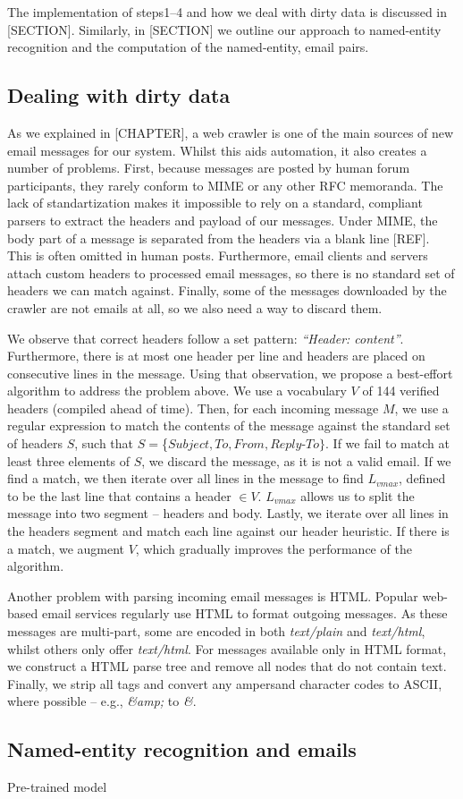 The implementation of steps1--4 and how we deal with dirty data is discussed in [SECTION]. Similarly, in [SECTION] we outline our approach to named-entity recognition and the computation of the named-entity, email pairs.

\subsection{Dealing with dirty data}
As we explained in [CHAPTER], a web crawler is one of the main sources of new email messages for our system. Whilst this aids automation, it also creates a number of problems. First, because messages are posted by human forum participants, they rarely conform to MIME or any other RFC memoranda. The lack of standartization makes it impossible to rely on a standard, compliant parsers to extract the headers and payload of our messages. Under MIME, the body part of a message is separated from the headers via a blank line [REF]. This is often omitted in human posts. Furthermore, email clients and servers attach custom headers to processed email messages, so there is no standard set of headers we can match against. Finally, some of the messages downloaded by the crawler are not emails at all, so we also need a way to discard them.

We observe that correct headers follow a set pattern: \textit{``Header: content''}. Furthermore, there is at most one header per line and headers are placed on consecutive lines in the message. Using that observation, we propose a best-effort algorithm to address the problem above. We use a vocabulary $V$ of 144 verified headers (compiled ahead of time). Then, for each incoming message $M$, we use a regular expression to match the contents of the message against the standard set of headers $S$, such that $S = $\{$Subject, To, From, Reply$-$To\}$. If we fail to match at least three elements of $S$, we discard the message, as it is not a valid email. If we find a match, we then iterate over all lines in the message to find $L_{vmax}$, defined to be the last line that contains a header $\in V$. $L_{vmax}$ allows us to split the message into two segment -- headers and body. Lastly, we iterate over all lines in the headers segment and match each line against our header heuristic. If there is a match, we augment $V$, which gradually improves the performance of the algorithm.

Another problem with parsing incoming email messages is HTML. Popular web-based email services regularly use HTML to format outgoing messages. As these messages are multi-part, some are encoded in both \emph{text/plain} and \emph{text/html}, whilst others only offer \emph{text/html}. For messages available only in HTML format, we construct a HTML parse tree and remove all nodes that do not contain text. Finally, we strip all tags and convert any ampersand character codes to ASCII, where possible -- e.g.,  \emph{\&amp;} to \emph{\&}.

\subsection{Named-entity recognition and emails}
Pre-trained model